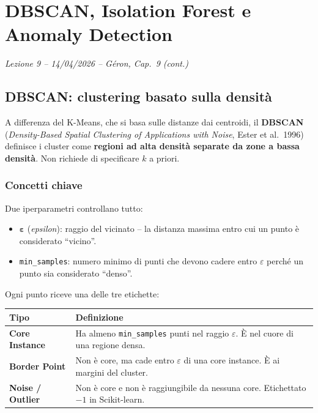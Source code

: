 \chapter{DBSCAN, Isolation Forest e Anomaly Detection}
\begin{flushright}\small\textit{Lezione 9 -- 14/04/2026 -- G\'eron, Cap.\ 9 (cont.)}\end{flushright}

\section{DBSCAN: clustering basato sulla densità}

A differenza del K-Means, che si basa sulle distanze dai centroidi, il \textbf{DBSCAN} (\emph{Density-Based Spatial Clustering of Applications with Noise}, Ester et al.\ 1996) definisce i cluster come \textbf{regioni ad alta densità separate da zone a bassa densità}. Non richiede di specificare $k$ a priori.

\subsection{Concetti chiave}

Due iperparametri controllano tutto:
\begin{itemize}
    \item $\boldsymbol{\varepsilon}$ (\emph{epsilon}): raggio del vicinato -- la distanza massima entro cui un punto è considerato ``vicino''.
    \item \texttt{min\_samples}: numero minimo di punti che devono cadere entro $\varepsilon$ perché un punto sia considerato ``denso''.
\end{itemize}

Ogni punto riceve una delle tre etichette:

\begin{center}
\renewcommand{\arraystretch}{1.3}
\begin{tabular}{@{} l p{10cm} @{}}
\toprule
\textbf{Tipo} & \textbf{Definizione} \\
\midrule
\textbf{Core Instance} & Ha almeno \texttt{min\_samples} punti nel raggio $\varepsilon$. È nel cuore di una regione densa. \\
\textbf{Border Point} & Non è core, ma cade entro $\varepsilon$ di una core instance. È ai margini del cluster. \\
\textbf{Noise / Outlier} & Non è core e non è raggiungibile da nessuna core. Etichettato $-1$ in Scikit-learn. \\
\bottomrule
\end{tabular}
\end{center}

